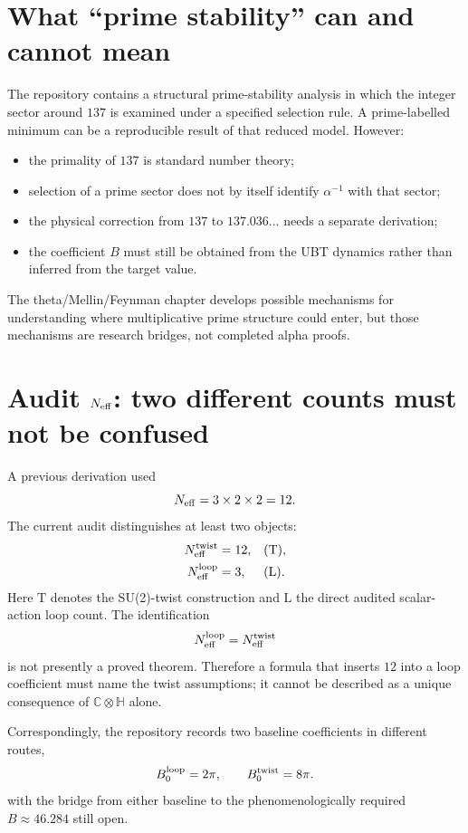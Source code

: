 \section{What ``prime stability'' can and cannot mean}
The repository contains a structural prime-stability analysis in which the
integer sector around $137$ is examined under a specified selection rule.  A
prime-labelled minimum can be a reproducible result of that reduced model.
However:
\begin{itemize}
 \item the primality of $137$ is standard number theory;
 \item selection of a prime sector does not by itself identify
       $\alpha^{-1}$ with that sector;
 \item the physical correction from $137$ to $137.036\ldots$ needs a separate
       derivation;
 \item the coefficient $B$ must still be obtained from the UBT dynamics rather
       than inferred from the target value.
\end{itemize}
The theta/Mellin/Feynman chapter develops possible mechanisms for understanding
where multiplicative prime structure could enter, but those mechanisms are
research bridges, not completed alpha proofs.

\section{Audit \(N_{\rm eff}\): two different counts must not be confused}
A previous derivation used
\[
 N_{\rm eff}=3\times2\times2=12.
\]
The current audit distinguishes at least two objects:
\begin{align*}
 N_{\rm eff}^{\rm twist}&=12,
 &&(\mathrm T),\\
 N_{\rm eff}^{\rm loop}&=3,
 &&(\mathrm L).
\end{align*}
Here $\mathrm T$ denotes the SU(2)-twist construction and $\mathrm L$ the
direct audited scalar-action loop count.
The identification
\[
 N_{\rm eff}^{\rm loop}=N_{\rm eff}^{\rm twist}
\]
is not presently a proved theorem.  Therefore a formula that inserts $12$ into
a loop coefficient must name the twist assumptions; it cannot be described as
a unique consequence of $\mathbb C\otimes\mathbb H$ alone.

Correspondingly, the repository records two baseline coefficients in different
routes,
\[
 B_0^{\rm loop}=2\pi,
 \qquad
 B_0^{\rm twist}=8\pi.
\]
with the bridge from either baseline to the phenomenologically required
$B\approx46.284$ still open.


